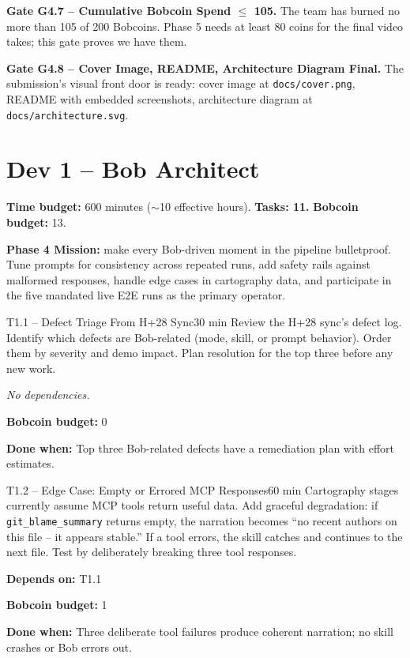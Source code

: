 \documentclass[11pt,letterpaper]{article}
\newcommand{\acceptance}[1]{\par\smallskip\textcolor{ibmgreen}{\textbf{Done when:}} #1}
\newcommand{\depends}[1]{\par\smallskip\textcolor{ibmorange}{\textbf{Depends on:}} #1}
\newcommand{\nodep}{\par\smallskip\textcolor{ibmgray}{\textit{No dependencies.}}}
\newcommand{\bobcost}[1]{\par\smallskip\textcolor{ibmaccent}{\textbf{Bobcoin budget:}} #1}
\begin{document}
\begin{gate}
\textbf{Gate G4.7 -- Cumulative Bobcoin Spend $\leq$ 105.} The team has burned no more than 105 of 200 Bobcoins. Phase 5 needs at least 80 coins for the final video takes; this gate proves we have them.
\end{gate}

\begin{gate}
\textbf{Gate G4.8 -- Cover Image, README, Architecture Diagram Final.} The submission's visual front door is ready: cover image at \texttt{docs/cover.png}, README with embedded screenshots, architecture diagram at \texttt{docs/architecture.svg}.
\end{gate}

\section{Dev 1 -- Bob Architect}

\textbf{Time budget:} 600 minutes (${\sim}$10 effective hours). \textbf{Tasks: 11.} \textbf{Bobcoin budget:} 13.

\textbf{Phase 4 Mission:} make every Bob-driven moment in the pipeline bulletproof. Tune prompts for consistency across repeated runs, add safety rails against malformed responses, handle edge cases in cartography data, and participate in the five mandated live E2E runs as the primary operator.

\begin{task}{T1.1 -- Defect Triage From H+28 Sync}{30 min}
Review the H+28 sync's defect log. Identify which defects are Bob-related (mode, skill, or prompt behavior). Order them by severity and demo impact. Plan resolution for the top three before any new work.
\nodep
\bobcost{0}
\acceptance{Top three Bob-related defects have a remediation plan with effort estimates.}
\end{task}

\begin{task}{T1.2 -- Edge Case: Empty or Errored MCP Responses}{60 min}
Cartography stages currently assume MCP tools return useful data. Add graceful degradation: if \texttt{git\_blame\_summary} returns empty, the narration becomes ``no recent authors on this file -- it appears stable.'' If a tool errors, the skill catches and continues to the next file. Test by deliberately breaking three tool responses.
\depends{T1.1}
\bobcost{1}
\acceptance{Three deliberate tool failures produce coherent narration; no skill crashes or Bob errors out.}
\end{task}
\end{document}
